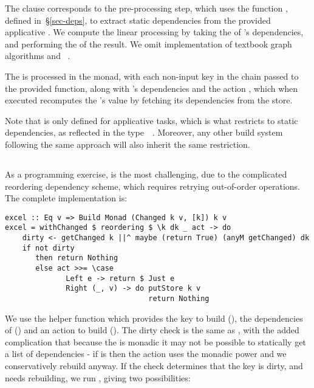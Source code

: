 \noindent
The  clause corresponds to the pre-processing step, which uses the
function , defined in~\S\ref{sec-deps}, to extract static
dependencies from the provided applicative . We compute the linear
processing  by taking the  of 's
dependencies, and performing the  of the result. We omit
implementation of textbook graph algorithms  and
~\cite{cormen2001introduction}.

The  is processed in the  monad, with each non-input key
 in the chain passed to the provided  function, along with
's dependencies and the action , which when executed recomputes
the 's value by fetching its dependencies from the store.

Note that  is only defined for applicative tasks, which is what
restricts \Make to static dependencies, as reflected in the
type~~. Moreover, any other build system following
the same  approach will also inherit the same restriction.

\subsection{\Excel}\label{sec-implementation-excel}


As a programming exercise, \Excel is the most challenging, due to the complicated reordering dependency scheme, which requires retrying out-of-order operations. The complete implementation is:

\begin{verbatim}
excel :: Eq v => Build Monad (Changed k v, [k]) k v
excel = withChanged $ reordering $ \k dk _ act -> do
    dirty <- getChanged k ||^ maybe (return True) (anyM getChanged) dk
    if not dirty
       then return Nothing
       else act >>= \case
              Left e -> return $ Just e
              Right (_, v) -> do putStore k v
                                 return Nothing
\end{verbatim}

We use the helper function  which provides the key to build (), the dependencies of  () and an action to build  (). The dirty check is the same as , with the added complication that because the  is monadic it may not be possible to statically get a list of dependencies - if  is  then the action uses the monadic power and we conservatively rebuild anyway. If the check determines that the key is dirty, and needs rebuilding, we run , giving two possibilities:

